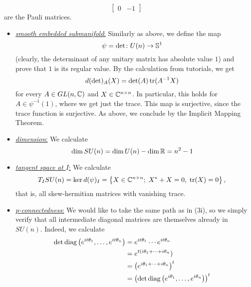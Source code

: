 \documentclass[a4paper, 12pt]{article}
\begin{document}
\begin{Exercise}
\begin{enumerate}[label=(\roman*)]
\[\begin{bmatrix}
                    0 & -1
                \end{bmatrix}
            \]
            are the Pauli matrices.
            \begin{itemize}
                \item \underline{\emph{smooth embedded submanifold}:}
                    Similarly as above, we define the map
                    \[
                        \psi = \det \colon U(n) \to \S^1
                    \]
                    (clearly, the determinant of any unitary matrix has absolute value $1$)
                    and prove that $1$ is its regular value.
                    By the calculation from tutorials, we get
                    \[
                        d(\det)_A(X) = \det(A) \tr(A^{-1}X)
                    \]
                    for every $A \in GL(n, \C)$ and $X \in \C^{n\times n}$.
                    In particular, this holds for $A \in \psi^{-1}(1)$,
                    where we get just the trace.
                    This map is surjective, since the trace function is surjective.
                    As above, we conclude by the Implicit Mapping Theorem.
                \item \underline{\emph{dimension}:}
                    We calculate
                    \[
                        \dim SU(n) = \dim U(n) - \dim \R = n^2 - 1
                    \]
                \item \underline{\emph{tangent space at $I$}:}
                    We calculate
                    \[
                        T_ISU(n) = \ker d(\psi)_I = \left\{ X \in \C^{n\times n} ; \; X^* + X = 0,\; \tr(X) = 0 \right\},
                    \]
                    that is, all skew-hermitian matrices with vanishing trace.
                \item \underline{\emph{p-connectedness}:}
                    We would like to take the same path as in (3i), so we simply verify that all intermediate diagonal matrices are themselves already in $SU(n)$.
                    Indeed, we calculate
                    \begin{align*}
                        \det\diag\left( e^{it\theta_1}, \dots, e^{it\theta_n} \right)
                        &= e^{it\theta_1}\cdots e^{it\theta_n} \\
                        &= e^{t(i\theta_1 + \cdots + i\theta_n}) \\
                        &= \left( e^{i\theta_1 + \cdots + i\theta_n} \right)^t \\
                        &= \left( \det\diag\left( e^{i\theta_1}, \dots, e^{i\theta_n} \right) \right)^t \\

\end{align*}
\end{itemize}
\end{enumerate}
\end{Exercise}
\end{document}
